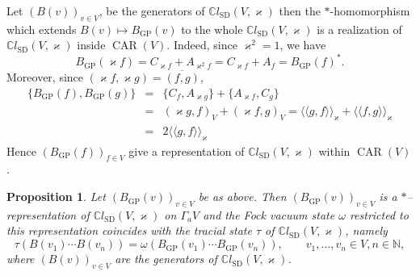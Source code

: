 \documentclass{article}
\newcommand{\llangle}{{\langle\!\langle}}
\newcommand{\rrangle}{{\rangle\!\rangle}}
\newcommand{\tmop}[1]{\ensuremath{\operatorname{#1}}}
\newtheorem{proposition}[theorem]{Proposition}
{\theorembodyfont{\rmfamily}\newtheorem{remark}[theorem]{Remark}}
\begin{document}
\begin{remark}
  \label{GPrem:GP-CAR}Let $(B (v))_{v \in V}$, be the generators of
  $\mathbb{C}l_{\tmop{SD}} (V, \varkappa)$ then the $\ast$-homomorphism which
  extends $B (v) \mapsto B_{\tmop{GP}} (v)$ to the whole
  $\mathbb{C}l_{\tmop{SD}} (V, \varkappa)$ is a realization of
  $\mathbb{C}l_{\tmop{SD}} (V, \varkappa)$ inside $\tmop{CAR} (V)$. Indeed,
  since $\varkappa^2 = 1$, we have
  \[ B_{\tmop{GP}} (\varkappa f) = C_{\varkappa f} + A_{\varkappa^2 f} =
     C_{\varkappa f} + A_f = B_{\tmop{GP}} (f)^{\ast} . \]
  Moreover, since $(\varkappa f, \varkappa g) = \overline{(f, g)}$,
  \begin{eqnarray*}
    \{ B_{\tmop{GP}} (f), B_{\tmop{GP}} (g) \} & = & \{ C_f, A_{\varkappa g}
    \} + \{ A_{\varkappa f}, C_g \}\\
    & = & (\varkappa g, f)_V + (\varkappa f, g)_V = \llangle g, f
    \rrangle_{\varkappa} + \llangle f, g \rrangle_{\varkappa}\\
    & = & 2 \llangle g, f \rrangle_{\varkappa}
  \end{eqnarray*}
  Hence $(B_{\tmop{GP}} (f))_{f \in V}$ give a representation of
  $\mathbb{C}l_{\tmop{SD}} (V, \varkappa)$ within $\tmop{CAR} (V)$.
\end{remark}

\begin{proposition}
  Let $(B_{\tmop{GP}} (v))_{v \in V}$ be as above. Then $(B_{\tmop{GP}}
  (v))_{v \in V}$ is a $\ast$--representation of $\mathbb{C}l_{\tmop{SD}} (V,
  \varkappa)$ on $\Gamma_a V$ and the Fock vacuum state $\omega$ restricted to
  this representation coincides with the tracial state $\tau$ of
  $\mathbb{C}l_{\tmop{SD}} (V, \varkappa)$, namely
  \begin{equation}
    \tau (B (v_1) \cdots B (v_n)) = \omega (B_{\tmop{GP}} (v_1) \cdots
    B_{\tmop{GP}} (v_n)), \qquad v_1, \ldots, v_n \in V, n \in \mathbb{N},
    \label{eq:equiv-gp}
  \end{equation}
  where $(B (v))_{v \in V}$ are the generators of $\mathbb{C}l_{\tmop{SD}} (V,
  \varkappa)$. 
\end{proposition}
\end{document}
